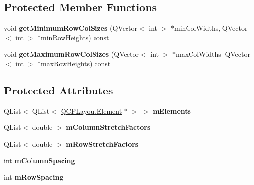\subsection*{\-Protected \-Member \-Functions}
\begin{DoxyCompactItemize}
\item 
\hypertarget{classQCPLayoutGrid_ac645fb9b1c4257b08a9f09dee10b9b3f}{void {\bfseries get\-Minimum\-Row\-Col\-Sizes} (\-Q\-Vector$<$ int $>$ $\ast$min\-Col\-Widths, \-Q\-Vector$<$ int $>$ $\ast$min\-Row\-Heights) const }\label{classQCPLayoutGrid_ac645fb9b1c4257b08a9f09dee10b9b3f}

\item 
\hypertarget{classQCPLayoutGrid_af348d903e3b8bc416f1fe1b8125d1173}{void {\bfseries get\-Maximum\-Row\-Col\-Sizes} (\-Q\-Vector$<$ int $>$ $\ast$max\-Col\-Widths, \-Q\-Vector$<$ int $>$ $\ast$max\-Row\-Heights) const }\label{classQCPLayoutGrid_af348d903e3b8bc416f1fe1b8125d1173}

\end{DoxyCompactItemize}
\subsection*{\-Protected \-Attributes}
\begin{DoxyCompactItemize}
\item 
\hypertarget{classQCPLayoutGrid_a3577d3855bf8ad20ef9079291a49f397}{\-Q\-List$<$ \-Q\-List$<$ \hyperlink{classQCPLayoutElement}{\-Q\-C\-P\-Layout\-Element} $\ast$ $>$ $>$ {\bfseries m\-Elements}}\label{classQCPLayoutGrid_a3577d3855bf8ad20ef9079291a49f397}

\item 
\hypertarget{classQCPLayoutGrid_ac6aabe62339f94f18b9f8adab94b1840}{\-Q\-List$<$ double $>$ {\bfseries m\-Column\-Stretch\-Factors}}\label{classQCPLayoutGrid_ac6aabe62339f94f18b9f8adab94b1840}

\item 
\hypertarget{classQCPLayoutGrid_a36c85a7eaf342680fb9b8a4977486f16}{\-Q\-List$<$ double $>$ {\bfseries m\-Row\-Stretch\-Factors}}\label{classQCPLayoutGrid_a36c85a7eaf342680fb9b8a4977486f16}

\item 
\hypertarget{classQCPLayoutGrid_ae9ac48f0791be07ead0a96dbd5622770}{int {\bfseries m\-Column\-Spacing}}\label{classQCPLayoutGrid_ae9ac48f0791be07ead0a96dbd5622770}

\item 
\hypertarget{classQCPLayoutGrid_a8b67f183f4645739cc4c794d75843b40}{int {\bfseries m\-Row\-Spacing}}\label{classQCPLayoutGrid_a8b67f183f4645739cc4c794d75843b40}

\end{DoxyCompactItemize}


